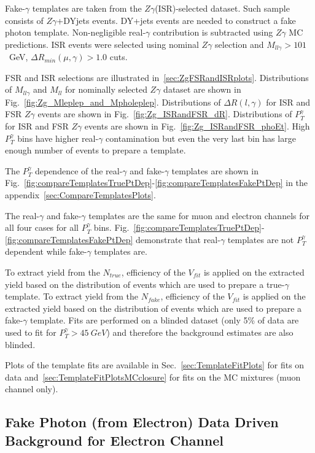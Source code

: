 Fake-$\gamma$ templates are taken from the $Z\gamma$(ISR)-selected dataset. Such sample consists of $Z\gamma$+DYjets events. DY+jets events are needed to construct a fake photon template. Non-negligible real-$\gamma$ contribution is subtracted using $Z\gamma$ MC predictions. ISR events were selected using nominal $Z\gamma$ selection and $M_{ll\gamma}>101$~GeV, $\Delta{R_{min}}(\mu,\gamma)>1.0$ cuts. 

FSR and ISR selections are illustrated in~\ref{sec:ZgFSRandISRplots}. Distributions of $M_{ll\gamma}$ and $M_{ll}$ for nominally selected $Z\gamma$ dataset are shown in Fig.~\ref{fig:Zg_Mleplep_and_Mpholeplep}. Distributions of $\Delta{R}(l,\gamma)$ for ISR and FSR $Z\gamma$ events are shown in Fig.~\ref{fig:Zg_ISRandFSR_dR}. Distributions of $P_{T}^{\gamma}$ for ISR and FSR $Z\gamma$ events are shown in Fig.~\ref{fig:Zg_ISRandFSR_phoEt}. High $P_{T}^{\gamma}$ bins have higher real-$\gamma$ contamination but even the very last bin has large enough number of events to prepare a template. 

The $P_{T}^{\gamma}$ dependence of the real-$\gamma$ and fake-$\gamma$ templates are shown in Fig.~\ref{fig:compareTemplatesTruePtDep}-\ref{fig:compareTemplatesFakePtDep} in the appendix~\ref{sec:CompareTemplatesPlots}. 

The real-$\gamma$ and fake-$\gamma$ templates are the same for muon and electron channels for all four cases for all $P_{T}^{\gamma}$ bins. Fig.~\ref{fig:compareTemplatesTruePtDep}-\ref{fig:compareTemplatesFakePtDep} demonstrate that real-$\gamma$ templates are not $P_{T}^{\gamma}$ dependent while fake-$\gamma$ templates are.

To extract yield from the $N_{true}$, efficiency of the $V_{fit}$ is applied on the extracted yield based on the distribution of events which are used to prepare a true-$\gamma$ template. To extract yield from the $N_{fake}$, efficiency of the $V_{fit}$ is applied on the extracted yield based on the distribution of events which are used to prepare a fake-$\gamma$ template. Fits are performed on a blinded dataset (only 5\% of data are used to fit for $P_T^{\gamma}>45~GeV$) and therefore the background estimates are also blinded.

Plots of the template fits are available in Sec.~\ref{sec:TemplateFitPlots} for fits on data and~\ref{sec:TemplateFitPlotsMCclosure} for fits on the MC mixtures (muon channel only).

\subsection{Fake Photon (from Electron) Data Driven Background for Electron Channel}

